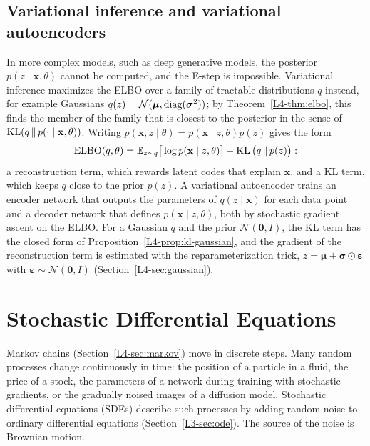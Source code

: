 \subsection{Variational inference and variational autoencoders}

In more complex models, such as deep generative models, the posterior $p(z \mid \mathbf{x}, \theta)$ cannot be computed, and the E-step is impossible. Variational inference maximizes the ELBO over a family of tractable distributions $q$ instead, for example Gaussians $q(z) = \mathcal{N}(\boldsymbol{\mu}, \operatorname{diag}(\boldsymbol{\sigma}^2))$; by Theorem~\ref{L4-thm:elbo}, this finds the member of the family that is closest to the posterior in the sense of $\operatorname{KL}(q \,\|\, p(\cdot \mid \mathbf{x}, \theta))$. Writing $p(\mathbf{x}, z \mid \theta) = p(\mathbf{x} \mid z, \theta)p(z)$ gives the form
\[\mathrm{ELBO}(q, \theta) = \mathbb{E}_{z \sim q}\big[\log p(\mathbf{x} \mid z, \theta)\big] - \operatorname{KL}\big(q \,\|\, p(z)\big):\]
a reconstruction term, which rewards latent codes that explain $\mathbf{x}$, and a KL term, which keeps $q$ close to the prior $p(z)$. A variational autoencoder trains an encoder network that outputs the parameters of $q(z \mid \mathbf{x})$ for each data point and a decoder network that defines $p(\mathbf{x} \mid z, \theta)$, both by stochastic gradient ascent on the ELBO. For a Gaussian $q$ and the prior $\mathcal{N}(\mathbf{0}, I)$, the KL term has the closed form of Proposition~\ref{L4-prop:kl-gaussian}, and the gradient of the reconstruction term is estimated with the reparameterization trick, $z = \boldsymbol{\mu} + \boldsymbol{\sigma} \odot \boldsymbol{\varepsilon}$ with $\boldsymbol{\varepsilon} \sim \mathcal{N}(\mathbf{0}, I)$ (Section~\ref{L4-sec:gaussian}).

\section{Stochastic Differential Equations}\label{L4-sec:sde}

Markov chains (Section~\ref{L4-sec:markov}) move in discrete steps. Many random processes change continuously in time: the position of a particle in a fluid, the price of a stock, the parameters of a network during training with stochastic gradients, or the gradually noised images of a diffusion model. Stochastic differential equations (SDEs) describe such processes by adding random noise to ordinary differential equations (Section~\ref{L3-sec:ode}). The source of the noise is Brownian motion.


